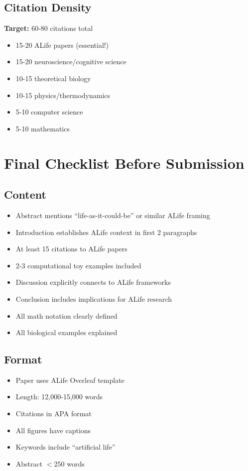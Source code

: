 \documentclass[11pt]{article}
\begin{document}
\subsection{Citation Density}

\textbf{Target:} 60-80 citations total
\begin{itemize}
    \item 15-20 ALife papers (essential!)
    \item 15-20 neuroscience/cognitive science
    \item 10-15 theoretical biology
    \item 10-15 physics/thermodynamics
    \item 5-10 computer science
    \item 5-10 mathematics
\end{itemize}

\section{Final Checklist Before Submission}

\subsection{Content}
\begin{itemize}[label=$\square$]
    \item Abstract mentions ``life-as-it-could-be'' or similar ALife framing
    \item Introduction establishes ALife context in first 2 paragraphs
    \item At least 15 citations to ALife papers
    \item 2-3 computational toy examples included
    \item Discussion explicitly connects to ALife frameworks
    \item Conclusion includes implications for ALife research
    \item All math notation clearly defined
    \item All biological examples explained
\end{itemize}

\subsection{Format}
\begin{itemize}[label=$\square$]
    \item Paper uses ALife Overleaf template
    \item Length: 12,000-15,000 words
    \item Citations in APA format
    \item All figures have captions
    \item Keywords include ``artificial life''
    \item Abstract $<$250 words
\end{itemize}
\end{document}
